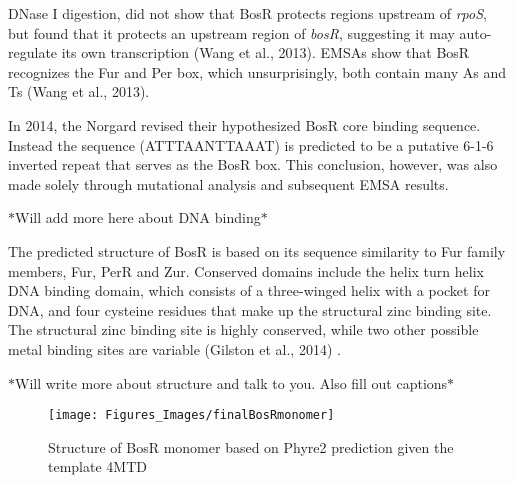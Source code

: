 \documentclass[12pt,twoside]{reedthesis}
\begin{document}
		
		
		 DNase I digestion, did not show that BosR protects regions upstream of \textit{rpoS}, but found that it protects an upstream region of \textit{bosR}, suggesting it may auto-regulate its own transcription (Wang et al., 2013). EMSAs show that BosR recognizes the Fur and Per box, which unsurprisingly, both contain many As and Ts (Wang et al., 2013). 
	
		In 2014, the Norgard revised their hypothesized BosR core binding sequence. Instead the sequence \-(ATTTAANTTAAAT) is predicted to be a putative 6-1-6 inverted repeat that serves as the BosR box. This conclusion, however, was also made solely through mutational analysis and subsequent EMSA results. 
		
	$*$Will add more here about DNA binding$*$
	 
	 
	 The predicted structure of BosR is based on its sequence similarity to Fur family members, Fur, PerR and Zur. Conserved domains include the helix turn helix DNA binding domain, which consists of a three-winged helix with a pocket for DNA, and four cysteine residues that make up the structural zinc binding site. The structural zinc binding site is highly conserved, while two other possible metal binding sites are variable (Gilston et al., 2014) .  
	 
	 $*$Will write more about structure and talk to you. Also fill out captions$*$
	 \clearpage
		
	
		 	\begin{figure}[t]
		 		
		 		\centering
		 		\texttt{[image: Figures\_Images/finalBosRmonomer]}
		 		\caption[Predicted structure BosR Monomer]{Structure of BosR monomer based on Phyre2 prediction given the template 4MTD}
		 		\label{BosRMonomer}
		 		\end{figure}
		 		
\end{document}
